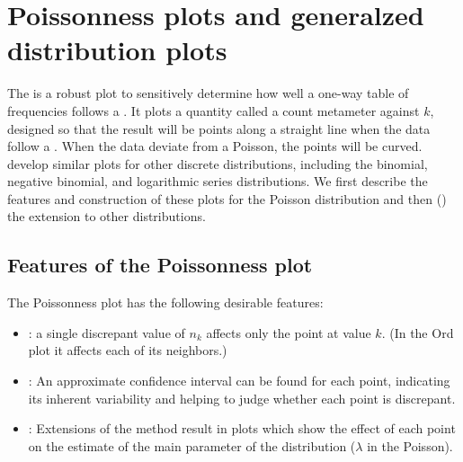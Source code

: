 \documentclass[11pt]{book}\usepackage[]{graphicx}\usepackage[]{color}
\begin{document}


\section{Poissonness plots and generalzed distribution plots}\label{sec:discrete-Poissonness}


The 
\citep{Hoaglin:80}
is a robust plot to sensitively determine how well a 
one-way table of frequencies follows a .
It plots a quantity called a count metameter
against \(k\), designed
so that the result will be points along a
straight line when the data follow a .  When the
data deviate from a Poisson, the points will be curved.
\citet{HoaglinTukey:85}
develop similar plots for other discrete distributions,
including the binomial, negative binomial, and logarithmic series
distributions.  We first describe the features and construction
of these plots for the Poisson distribution and then ()
the extension to other distributions.



\subsection{Features of the Poissonness plot}
The Poissonness plot has the following desirable features:
\begin{itemize}
\item {}: a single discrepant value of \(n_k\)
       affects only the point at value \(k\).  (In the Ord plot
       it affects each of its neighbors.)
\item {}:  An approximate confidence
       interval can be found for each point, indicating its inherent
       variability and helping to judge whether each point is
       discrepant.
\item {}:  Extensions of the method result in
       plots which show the effect of each point on the estimate of
       the main parameter of the distribution (\(\lambda\) in the
       Poisson).
\end{itemize}
\end{document}
